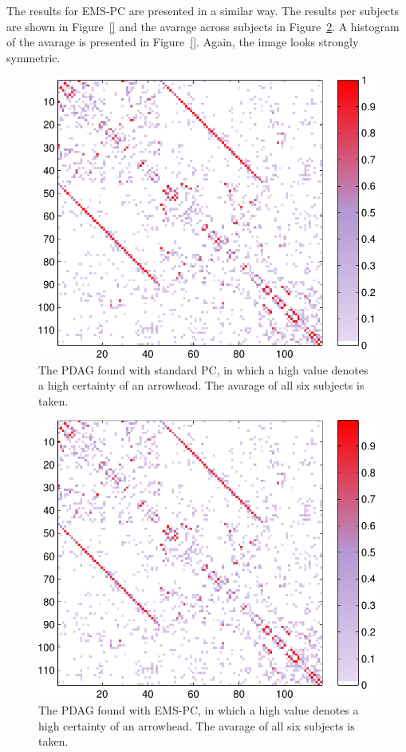 \documentclass[a4paper, 10pt, english, onecolumn]{article}
\begin{document}
The results for EMS-PC are presented in a similar way. The results per subjects are shown in Figure~\ref{} and the avarage across subjects in Figure~\ref{fig:pdag_avg_ems}. A histogram of the avarage is presented in Figure~\ref{}. Again, the image looks strongly symmetric.

\begin{figure}[h!]
  \centering
  \includegraphics{images/pdag_avg_colored_mod}
  \caption{The PDAG found with standard PC, in which a high value denotes a high certainty of an arrowhead. The avarage of all six subjects is taken.}
  \label{fig:pdag_avg_mod}
\end{figure}

\begin{figure}[h!]
  \centering
  \includegraphics{images/PDAG_avg_colored_expl}
  \caption{The PDAG found with EMS-PC, in which a high value denotes a high certainty of an arrowhead. The avarage of all six subjects is taken.}
  \label{fig:pdag_avg_ems}
\end{figure}
\end{document}
